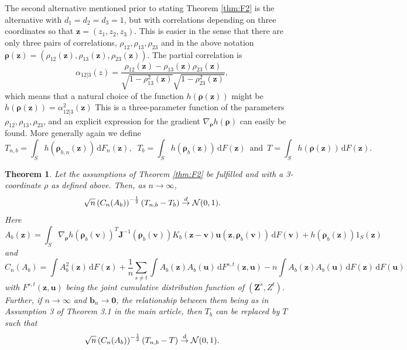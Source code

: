 \documentclass[
  12pt,
  letterpaper]{article}
\newtheorem{thm}{Theorem}[section]
\numberwithin{equation}{section}
\newcommand{\Z}{\bm{Z}}
\newcommand{\z}{\bm{z}}
\newcommand{\fv}{\bm{v}}
\newcommand{\fu}{\bm{u}}
\newcommand{\J}{\bm{J}}
\newcommand{\frho}{\bm{\rho}}
\newcommand{\bb}{\bm{b}}
\newcommand{\di}{\,\textrm{d}}
\begin{document}
The second alternative mentioned prior to stating Theorem \ref{thm:F2} is the alternative with \(d_1=d_2=d_3=1\), but with correlations depending on three coordinates so that \(\z=(z_1,z_2,z_3)\). This is easier in the sense that there are only three pairs of correlations, \(\rho_{12}, \rho_{13}, \rho_{23}\) and in the above notation \(\frho(\z) = (\rho_{12}(\z), \rho_{13}(\z), \rho_{23}(\z))\). The partial correlation is
\[
\alpha_{12|3}(z) = \frac{\rho_{12}(\z)-\rho_{13}(\z)\rho_{23}(\z)}{\sqrt{1-\rho_{13}^2(\z)}\sqrt{1-\rho_{23}^2(\z)}},
\]
which means that a natural choice of the function \(h(\frho(\z))\) might be \(h(\frho(\z)) = \alpha_{12|3}^2(\z)\) This is a three-parameter function of the parameters \(\rho_{12}, \rho_{13},\rho_{23}\), and an explicit expression for the gradient \(\nabla_{\frho}h(\frho)\) can easily be found. More generally again we define
\[
T_{n,b} = \int_S h(\frho_{b,n}(\z)) \di F_n(\z),\;\; T_b= \int_S h(\frho_b(\z)) \di F(\z) \, \textrm{ and } \, T = \int_S h(\frho(\z)) \di F(\z).
\]

\begin{thm}
Let the assumptions of Theorem \ref{thm:F2} be fulfilled and with a 3-coordinate $\rho$ as defined above. Then,
as $n \to \infty$,
$$
\sqrt{n}\left(C_{n}(A_b)\right)^{-\frac{1}{2}}(T_{n,b} - T_b) \buildrel {d} \over {\to} {\cal N}(0,1).
$$
Here 
$$
A_b(\z) = \int_S \nabla_{\frho}h(\frho_b(\fv))^{T}{\J}^{-1}(\frho_b(\fv))K_b(\z-\fv)\fu(\z,\frho_b(\fv)) \di F(\fv) + h(\frho_b(\z))1_S(\z)
$$
and 
$$
C_n(A_b) = \int A_b^2(\z) \di F(\z) + \frac{1}{n}\sum_{s \neq t}\int A_b(\z)A_b(\fu) \di F^{s,t}(\z,\fu) - n\int A_b(\z)A_b(\fu) \di F(\z) \di F(\fu)
$$
with $F^{s,t}(\z,\fu)$ being the joint cumulative distribution function of $(\Z^s,Z^t)$. Further, if $n \to \infty$ and $\bb_n \to \bm{0}$, the relationship between them being as in Assumption 3 of Theorem 3.1 in the main article, then $T_b$ can be replaced by $T$ such that
$$
\sqrt{n}\left(C_n(A_b)\right)^{-\frac{1}{2}}(T_{n,b} - T) \buildrel {d} \over {\to} {\cal N}(0,1).
$$
\label{thm:F3}
\end{thm}
\end{document}
